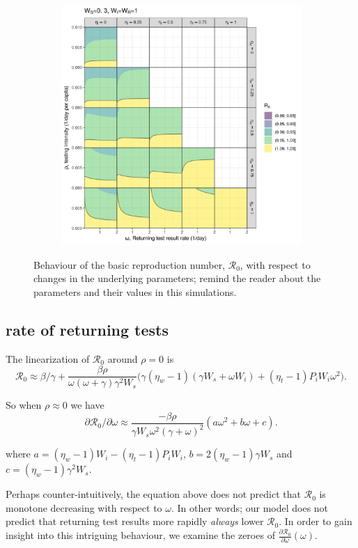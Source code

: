 \documentclass{article}
\newcommand{\Rnum}{\mathcal{R}_0}
\theoremstyle{definition} %
\begin{document}
\begin{figure}[h!]
\begin{subfigure}[t]{.45\textwidth}
\includegraphics[width=\linewidth]{./pix/R0contour_TTI.png}
\end{subfigure}
\caption{Behaviour of the basic reproduction number, $\Rnum$, with respect to changes in the underlying parameters; remind the reader about the parameters and their values in this simulations.}
\label{fig:panels}
\end{figure}

\subsection{rate of returning tests}
The linearization of $\Rnum$ around $\rho=0$ is
\begin{equation}\label{linearization}
\Rnum \approx \beta/\gamma + \frac{\beta \rho}{\omega (\omega+\gamma) \gamma^2 W_s} \Big(\gamma(\eta_w-1)(\gamma W_s+\omega W_i) + (\eta_t -1)P_iW_i \omega^2 \Big). 
\end{equation}

So when $\rho \approx 0$ we have $$\partial{\Rnum}/\partial{\omega} \approx  \frac{-\beta \rho}{\gamma W_s\omega^2 (\gamma+\omega)^2}  (a \omega^2 + b \omega + c).$$

where $a=(\eta_w-1)W_i-(\eta_t-1)P_iW_i$, $b=2(\eta_w-1)\gamma W_s$ and $c=(\eta_w-1)\gamma^2 W_s$. 

Perhaps counter-intuitively, the equation above does not predict that $\Rnum$ is monotone decreasing with respect to $\omega$. In other words; our model does not predict that returning test results more rapidly \textit{always} lower $\Rnum$. In order to gain insight into this intriguing behaviour, we examine the zeroes of $\frac{\partial{\Rnum}}{\partial{\omega}}(\omega)$.
\end{document}

